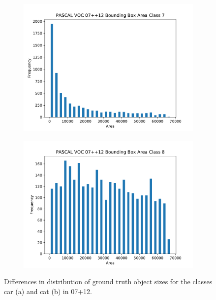 \begin{figure}[H]
    \centering
    \begin{subfigure}[b]{0.45\textwidth}
        \center
        \includegraphics[width=\textwidth]{Figs/Conclusion/trainvalhist_class7.pdf}
        \caption{}\label{fig:}
    \end{subfigure}
    \begin{subfigure}[b]{0.45\textwidth}
        \center
        \includegraphics[width=\textwidth]{Figs/Conclusion/trainvalhist_class8.pdf}
        \caption{}\label{fig:}
    \end{subfigure}
    \caption{Differences in distribution of ground truth object sizes for the classes car (a) and cat (b) in 07+12.}
    \label{fig:classskew}
\end{figure} 

